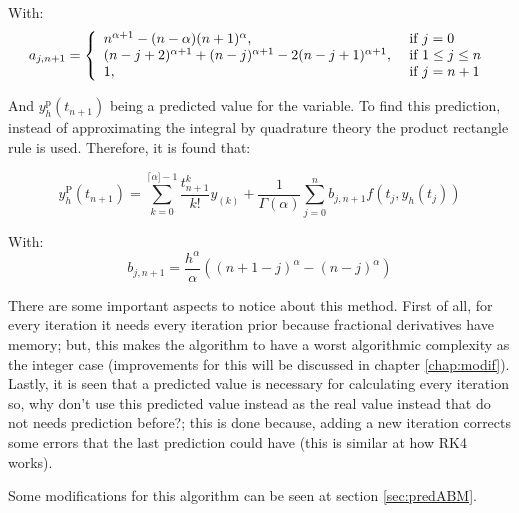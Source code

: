 With:
\begin{equation*}
    a _ { j , n + 1 } = \left\{ \begin{array} { l l } { n ^ { \alpha + 1 } - ( n - \alpha ) ( n + 1 ) ^ { \alpha } , } & { \text { if } j = 0 } \\ { ( n - j + 2 ) ^ { \alpha + 1 } + ( n - j ) ^ { \alpha + 1 } - 2 ( n - j + 1 ) ^ { \alpha + 1 } , } & { \text { if } 1 \leq j \leq n } \\ { 1 , } & { \text { if } j = n + 1 } \end{array} \right.
\end{equation*}

And $y _ { h } ^ { \mathrm { p } } \left( t _ { n + 1 } \right)$ being a predicted value for the variable. To find this prediction, instead of approximating the integral by quadrature theory the product rectangle rule is used. Therefore, it is found that:

\begin{equation*}
    y _ { h } ^ { \mathrm { P } } \left( t _ { n + 1 } \right) = \sum _ { k = 0 } ^ { \lceil \alpha ] - 1 } \frac { t _ { n + 1 } ^ { k } } { k ! } y _ { ( k ) } + \frac { 1 } { \Gamma ( \alpha ) } \sum _ { j = 0 } ^ { n } b _ { j , n + 1 } f \left( t _ { j } , y _ { h } \left( t _ { j } \right) \right)
\end{equation*}

With:
\begin{equation*}
    b _ { j , n + 1 } = \frac { h ^ { \alpha } } { \alpha } \left( ( n + 1 - j ) ^ { \alpha } - ( n - j ) ^ { \alpha } \right)
\end{equation*}

There are some important aspects to notice about this method. First of all, for every iteration it needs every iteration prior because fractional derivatives have memory; but, this makes the algorithm to have a worst algorithmic complexity as the integer case (improvements for this will be discussed in chapter \ref{chap:modif}). Lastly, it is seen that a predicted value is necessary for calculating every iteration so, why don't use this predicted value instead as the real value instead that do not needs prediction before?; this is done because, adding a new iteration corrects some errors that the last prediction could have (this is similar at how RK4 works).

Some modifications for this algorithm can be seen at section \ref{sec:predABM}.

